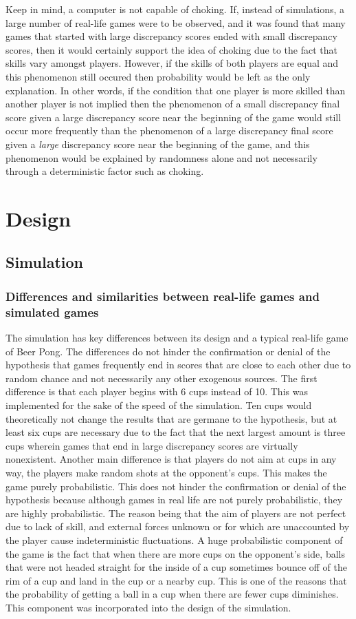 \documentclass{article}
\begin{document}
Keep in mind, a computer is not capable of choking. If, instead of simulations, a large number of real-life games were to be observed, and it was found that many games that started with large discrepancy scores ended with small discrepancy scores, then it would certainly support the idea of choking due to the fact that skills vary amongst players. However, if the skills of both players are equal and this phenomenon still occured then probability would be left as the only explanation. In other words, if the condition that one player is more skilled than another player is not implied then the phenomenon of a small discrepancy final score given a large discrepancy score near the beginning of the game would still occur more frequently than the phenomenon of a large discrepancy final score given a \textit{large} discrepancy score near the beginning of the game, and this phenomenon would be explained by randomness alone and not necessarily through a deterministic factor such as choking. 

\section{Design}
\subsection{Simulation}
\subsubsection{Differences and similarities between real-life games and simulated games}
The simulation has key differences between its design and a typical real-life game of Beer Pong. The differences do not hinder the confirmation or denial of the hypothesis that games frequently end in scores that are close to each other due to random chance and not necessarily any other exogenous sources. The first difference is that each player begins with 6 cups instead of 10. This was implemented for the sake of the speed of the simulation. Ten cups would theoretically not change the results that are germane to the hypothesis, but at least six cups are necessary due to the fact that the next largest amount is three cups wherein games that end in large discrepancy scores are virtually nonexistent. Another main difference is that players do not aim at cups in any way, the players make random shots at the opponent's cups. This makes the game purely probabilistic. This does not hinder the confirmation or denial of the hypothesis because although games in real life are not purely probabilistic, they are highly probabilistic. The reason being that the aim of players are not perfect due to lack of skill, and external forces unknown or for which are unaccounted by the player cause indeterministic fluctuations. A huge probabilistic component of the game is the fact that when there are more cups on the opponent's side, balls that were not headed straight for the inside of a cup sometimes bounce off of the rim of a cup and land in the cup or a nearby cup. This is one of the reasons that the probability of getting a ball in a cup when there are fewer cups diminishes. This component was incorporated into the design of the simulation.
\end{document}
